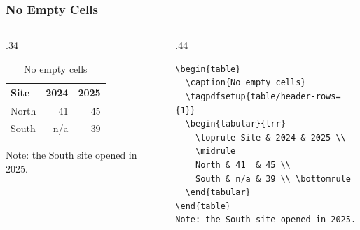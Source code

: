 \documentclass{ltx-talk}
\begin{document}
\begin{frame*}
  \frametitle{No Empty Cells}
  \begin{columns}
    \begin{column}{.34\textwidth}
      \begin{table}
        \caption{No empty cells}\label{tab:noempty}
        \begin{tabular}{lrr}
          \toprule Site & 2024 & 2025 \\ \midrule
          North & 41  & 45 \\
          South & n/a & 39 \\ \bottomrule
        \end{tabular}
      \end{table}
      Note: the South site opened in 2025.
    \end{column}
    \begin{column}{.44\textwidth}
\small
\begin{verbatim}
\begin{table}
  \caption{No empty cells}
  \tagpdfsetup{table/header-rows={1}}
  \begin{tabular}{lrr}
    \toprule Site & 2024 & 2025 \\
    \midrule
    North & 41  & 45 \\
    South & n/a & 39 \\ \bottomrule
  \end{tabular}
\end{table}
Note: the South site opened in 2025.
\end{verbatim}
    \end{column}
  \end{columns}
\end{frame*}
\end{document}
